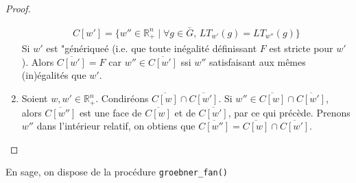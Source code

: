 \begin{proof}
\begin{enumerate}
                \begin{align*}
                    C[w'] = \{w'' \in \mathbb{R}_+^n \mid \forall g \in \bar G,\, LT_{w'}(g) = LT_{w''}(g) \}
                \end{align*}
                Si $w'$ est "génériqueé (i.e. que toute inégalité définissant $F$ est stricte pour $w'$). Alors $\overline{C[w']} = F$ car $w'' \in \overline{C[w']}$ ssi $w''$ satisfaisant aux mêmes (in)égalités que $w'$.
                \item Soient $w,w' \in \mathbb{R}_+^n$. Condiréons $\overline{C[w]} \cap \overline{C[w']}$. Si $w'' \in \overline{C[w]} \cap \overline{C[w']}$, alors $\overline{C[w'']}$ est une face de $\overline{C[w]}$ et de $\overline{C[w']}$, par ce qui précède. Prenons $w''$ dans l'intérieur relatif, on obtiens que $\overline{C[w'']} = \overline{C[w]} \cap \overline{C[w']}$.
            \end{enumerate}
        \end{proof}
        \begin{remq}
            En sage, on dispose de la procédure \texttt{groebner_fan()}
        \end{remq}


